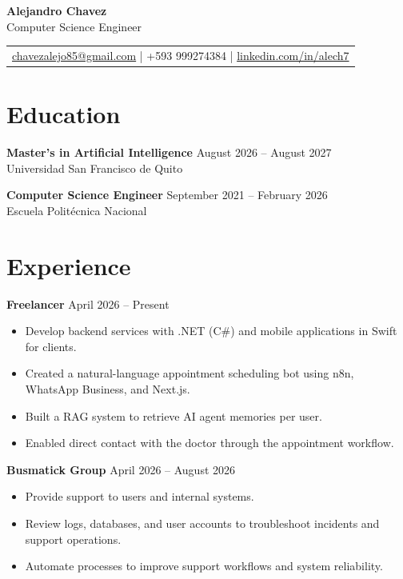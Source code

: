 \documentclass[11pt,a4paper]{article}
\newenvironment{uniformindent}{%
  \begin{list}{}{%
    \setlength{\leftmargin}{2em}
    \setlength{\rightmargin}{0pt}
    \setlength{\topsep}{0pt}
    \setlength{\partopsep}{0pt}
    \setlength{\parsep}{0pt}
    \setlength{\itemsep}{0pt}
  }
  \item[]
}{%
  \end{list}
}
\begin{document}
\begin{center}
    {\LARGE \textbf{Alejandro Chavez}} \\[0.15cm]
    Computer Science Engineer \\[0.2cm]
    \begin{tabular}{@{} c @{}}
        \href{mailto:chavezalejo85@gmail.com}{chavezalejo85@gmail.com} \quad | \quad +593 999274384 \quad | \quad \href{https://www.linkedin.com/in/alech7/}{linkedin.com/in/alech7}
    \end{tabular}
\end{center}

\begin{uniformindent}

\section*{Education}

\begin{samepage}
\textbf{Master's in Artificial Intelligence} \hfill August 2026 -- August 2027\\
Universidad San Francisco de Quito\\
\end{samepage}

\begin{samepage}
\textbf{Computer Science Engineer} \hfill September 2021 -- February 2026\\
Escuela Politécnica Nacional\\
\end{samepage}

\section*{Experience}

\textbf{Freelancer} \hfill April 2026 -- Present
\begin{itemize}
    \item Develop backend services with .NET (C\#) and mobile applications in Swift for clients.
    \item Created a natural-language appointment scheduling bot using n8n, WhatsApp Business, and Next.js.
    \item Built a RAG system to retrieve AI agent memories per user.
    \item Enabled direct contact with the doctor through the appointment workflow.
\end{itemize}

\textbf{Busmatick Group} \hfill April 2026 -- August 2026
\begin{itemize}
    \item Provide support to users and internal systems.
    \item Review logs, databases, and user accounts to troubleshoot incidents and support operations.
    \item Automate processes to improve support workflows and system reliability.
\end{itemize}


\end{uniformindent}
\end{document}
